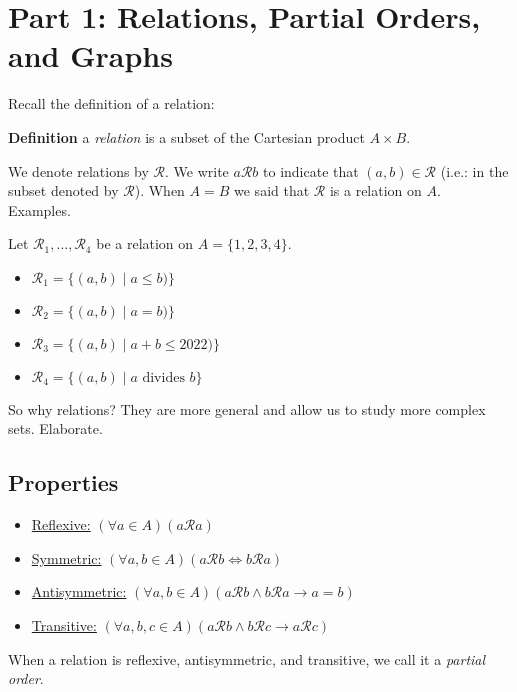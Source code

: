 \documentclass{article}
\begin{document}
\section*{Part 1: Relations, Partial Orders, and Graphs}

    Recall the definition of a relation:
    
    \vspace{1.5mm}
    \textbf{Definition} a \textit{relation} is a subset of the Cartesian product $A\times B$.
    
    \vspace{1.5mm}
    We denote relations by $\mathcal{R}$. We write $a\mathcal{R} b$ to indicate that $(a,b)\in \mathcal{R}$ (i.e.: in the subset denoted by $\mathcal{R}$). When $A=B$ we said that $\mathcal{R}$ is a relation on $A$.\\

    Examples.
    
    Let $\mathcal{R}_1, \dots, \mathcal{R}_4$ be a relation on $A = \{1, 2, 3, 4\}$.
    \begin{itemize}
        \item $\mathcal{R}_1 = \{(a, b) \mid a \le b)\}$
        \item $\mathcal{R}_2 = \{(a, b) \mid a = b)\}$
        \item $\mathcal{R}_3 = \{(a, b) \mid a+b \le 2022)\}$
        \item $\mathcal{R}_4 = \{(a, b) \mid a \text{ divides } b\}$
    \end{itemize}
    So why relations? They are more general and allow us to study more complex sets. Elaborate. \\
    
\subsection*{Properties}
    
    \begin{itemize}
        \item \underline{Reflexive:} $(\forall a \in A)(a\mathcal{R}a)$
        \item \underline{Symmetric:} $(\forall a, b \in A)(a\mathcal{R}b \iff b\mathcal{R}a)$
        \item \underline{Antisymmetric:} $(\forall a, b\in A)(a\mathcal{R}b \wedge b\mathcal{R}a \rightarrow a=b)$
        \item \underline{Transitive:} $(\forall a, b, c\in A)(a\mathcal{R}b \wedge b\mathcal{R}c \rightarrow a\mathcal{R}c)$
    \end{itemize}
When a relation is reflexive, antisymmetric, and transitive, we call it a \textit{partial order}.
\end{document}
